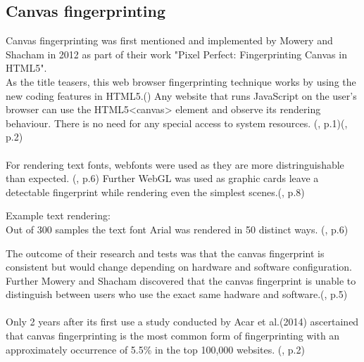 \subsection{Canvas fingerprinting}
Canvas fingerprinting was first mentioned and implemented by Mowery and Shacham in 2012 as part of their work "Pixel Perfect: Fingerprinting Canvas in HTML5".\\
As the title teasers, this web browser fingerprinting technique works by using the new coding features in HTML5.(\textcite{pixel18}) Any website that runs JavaScript on the user's browser can use the HTML5<canvas> element and observe its rendering behaviour. There is no need for any special access to system resources. (\textcite{mowery12}, p.1)(\textcite{upi15}, p.2)\\\\
For rendering text fonts, webfonts were used as they are more distringuishable than expected. (\textcite{mowery12}, p.6) Further WebGL was used as  graphic cards leave a detectable fingerprint while rendering even the simplest scenes.(\textcite{mowery12}, p.8)\\
\begin{tcolorbox}
	Example text rendering: \\
	Out of 300 samples the text font Arial was rendered in 50 distinct ways. (\textcite{mowery12}, p.6)
\end{tcolorbox}
The outcome of their research and tests was that the canvas fingerprint is consistent but would change depending on hardware and software configuration. Further Mowery and Shacham discovered that the canvas fingerprint is unable to distinguish between users who use the exact same hadware and software.(\textcite{mowery12}, p.5)\\\\
Only 2 years after its first use a study conducted by Acar et al.(2014) ascertained that canvas fingerprinting is the most common form of fingerprinting with an approximately occurrence of 5.5\% in the top 100,000 websites. (\textcite{upi15}, p.2)

